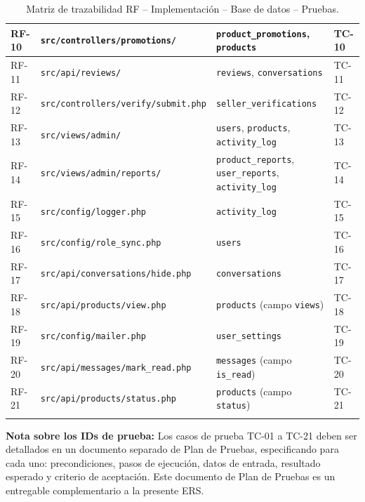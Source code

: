 \documentclass[11pt,a4paper]{report}
\begin{document}
\begin{longtable}{|l|p{5.5cm}|p{5cm}|l|}
RF-10 & \texttt{src/controllers/promotions/} & \texttt{product\_promotions}, \texttt{products} & TC-10 \\ \hline
RF-11 & \texttt{src/api/reviews/} & \texttt{reviews}, \texttt{conversations} & TC-11 \\ \hline
RF-12 & \texttt{src/controllers/verify/submit.php} & \texttt{seller\_verifications} & TC-12 \\ \hline
RF-13 & \texttt{src/views/admin/} & \texttt{users}, \texttt{products}, \texttt{activity\_log} & TC-13 \\ \hline
RF-14 & \texttt{src/views/admin/reports/} & \texttt{product\_reports}, \texttt{user\_reports}, \texttt{activity\_log} & TC-14 \\ \hline
RF-15 & \texttt{src/config/logger.php} & \texttt{activity\_log} & TC-15 \\ \hline
RF-16 & \texttt{src/config/role\_sync.php} & \texttt{users} & TC-16 \\ \hline
RF-17 & \texttt{src/api/conversations/hide.php} & \texttt{conversations} & TC-17 \\ \hline
RF-18 & \texttt{src/api/products/view.php} & \texttt{products} (campo \texttt{views}) & TC-18 \\ \hline
RF-19 & \texttt{src/config/mailer.php} & \texttt{user\_settings} & TC-19 \\ \hline
RF-20 & \texttt{src/api/messages/mark\_read.php} & \texttt{messages} (campo \texttt{is\_read}) & TC-20 \\ \hline
RF-21 & \texttt{src/api/products/status.php} & \texttt{products} (campo \texttt{status}) & TC-21 \\ \hline
\caption{Matriz de trazabilidad RF -- Implementación -- Base de datos -- Pruebas.}
\end{longtable}

\vspace{1cm}
\noindent\textbf{Nota sobre los IDs de prueba:} Los casos de prueba TC-01 a TC-21 deben ser detallados en un documento separado de Plan de Pruebas, especificando para cada uno: precondiciones, pasos de ejecución, datos de entrada, resultado esperado y criterio de aceptación. Este documento de Plan de Pruebas es un entregable complementario a la presente ERS.
\end{document}
